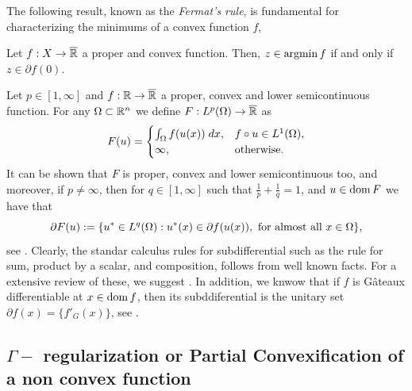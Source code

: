 The following result, known as the \textit{Fermat's rule}, is fundamental for characterizing the minimums of a convex function $f$,
\begin{theorem}
    Let $f:X\to \overline{\mathbb{R}}$ a proper and convex function. Then, $z\in \operatorname{argmin} f$ if and only if $z\in \partial f(0)$.
\end{theorem}
Let $p\in [1,\infty]$ and $f: \mathbb{R}\to \overline{\mathbb{R}}$ a proper, convex and lower semicontinuous function. For any $\Omega \subset \mathbb{R}^n$ we define $F:L^p(\Omega)\to \overline{\mathbb{R}}$ as
\begin{equation}\label{eq:funtion_lp_1}
    F(u)=\begin{cases}
        \int_{\Omega} f(u(x))\; dx, & f\circ u \in L^1(\Omega),\\
        \infty,& \mbox{otherwise}.
    \end{cases}
    \end{equation}
It can be shown that $F$ is proper, convex and lower semicontinuous too, and moreover, if $p\ne \infty$, then for $q\in [1,\infty]$ such that $\frac{1}{p}+\frac{1}{q}=1$, and $u\in \operatorname{dom} F$ we have that
\begin{equation}\label{eq:subb_lp_integrand}
    \partial F(u):=\{u^*\in L^q(\Omega): u^*(x)\in \partial f(u(x)), \mbox{ for almost all }x\in \Omega\},
\end{equation}
see \cite[Proposition 16.63]{combettes}. Clearly, the standar calculus rules for subdifferential such as the rule for sum, product by a scalar, and composition, follows from well known facts. For a extensive review of these, we suggest \cite{combettes}. In addition, we knwow that if $f$ is Gâteaux differentiable at $x\in \operatorname{dom} f$, then its subddiferential is the unitary set $\partial f(x)=\{f'_{G}(x)\}$, see \cite[Proposition 17.31]{combettes}.

\subsection{$\Gamma-$ regularization or Partial Convexification of a non convex function}

